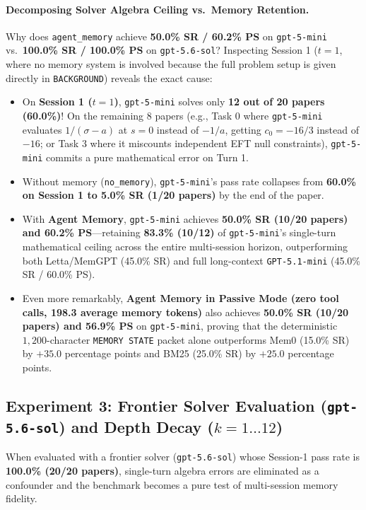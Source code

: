 \documentclass[11pt,a4paper]{article}
\begin{document}
\paragraph{Decomposing Solver Algebra Ceiling vs.\ Memory Retention.}
Why does \texttt{agent\_memory} achieve \textbf{50.0\% SR / 60.2\% PS} on \texttt{gpt-5-mini} vs.\ \textbf{100.0\% SR / 100.0\% PS} on \texttt{gpt-5.6-sol}? Inspecting Session 1 ($t=1$, where no memory system is involved because the full problem setup is given directly in \texttt{BACKGROUND}) reveals the exact cause:
\begin{itemize}[leftmargin=1.5em,itemsep=1pt]
    \item On \textbf{Session 1 ($t=1$)}, \texttt{gpt-5-mini} solves only \textbf{12 out of 20 papers (60.0\%)}! On the remaining 8 papers (e.g., Task 0 where \texttt{gpt-5-mini} evaluates $1/(\sigma-a)$ at $s=0$ instead of $-1/a$, getting $c_0 = -16/3$ instead of $-16$; or Task 3 where it miscounts independent EFT null constraints), \texttt{gpt-5-mini} commits a pure mathematical error on Turn 1.
    \item Without memory (\texttt{no\_memory}), \texttt{gpt-5-mini}'s pass rate collapses from \textbf{60.0\% on Session 1 to 5.0\% SR (1/20 papers)} by the end of the paper.
    \item With \textbf{Agent Memory}, \texttt{gpt-5-mini} achieves \textbf{50.0\% SR (10/20 papers) and 60.2\% PS}---retaining \textbf{83.3\% (10/12)} of \texttt{gpt-5-mini}'s single-turn mathematical ceiling across the entire multi-session horizon, outperforming both Letta/MemGPT (45.0\% SR) and full long-context \texttt{GPT-5.1-mini} (45.0\% SR / 60.0\% PS).
    \item Even more remarkably, \textbf{Agent Memory in Passive Mode (zero tool calls, 198.3 average memory tokens)} also achieves \textbf{50.0\% SR (10/20 papers) and 56.9\% PS} on \texttt{gpt-5-mini}, proving that the deterministic $1{,}200$-character \texttt{MEMORY STATE} packet alone outperforms Mem0 (15.0\% SR) by $+35.0$ percentage points and BM25 (25.0\% SR) by $+25.0$ percentage points.
\end{itemize}

\subsection{Experiment 3: Frontier Solver Evaluation (\texttt{gpt-5.6-sol}) and Depth Decay ($k=1\dots 12$)}

When evaluated with a frontier solver (\texttt{gpt-5.6-sol}) whose Session-1 pass rate is \textbf{100.0\% (20/20 papers)}, single-turn algebra errors are eliminated as a confounder and the benchmark becomes a pure test of multi-session memory fidelity.
\end{document}
